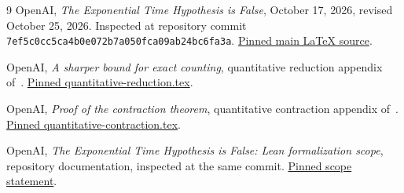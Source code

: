\documentclass[11pt]{article}
\theoremstyle{definition}
\theoremstyle{remark}
\newcommand{\upstream}{7ef5c0cc5ca4b0e072b7a050fca09ab24bc6fa3a}
\begin{document}
\begin{thebibliography}{9}
OpenAI, \emph{The Exponential Time Hypothesis is False}, October 17, 2026,
revised October 25, 2026. Inspected at repository commit
\texttt{\upstream}.
\href{https://github.com/openai/math/blob/7ef5c0cc5ca4b0e072b7a050fca09ab24bc6fa3a/preprints/The-Exponential-Time-Hypothesis-is-False-October-25-2026/build/main_full_version.tex}{Pinned main LaTeX source}.

OpenAI, \emph{A sharper bound for exact counting}, quantitative reduction
appendix of~\cite{source}.
\href{https://github.com/openai/math/blob/7ef5c0cc5ca4b0e072b7a050fca09ab24bc6fa3a/preprints/The-Exponential-Time-Hypothesis-is-False-October-25-2026/build/quantitative-reduction.tex}{Pinned quantitative-reduction.tex}.

OpenAI, \emph{Proof of the contraction theorem}, quantitative contraction
appendix of~\cite{source}.
\href{https://github.com/openai/math/blob/7ef5c0cc5ca4b0e072b7a050fca09ab24bc6fa3a/preprints/The-Exponential-Time-Hypothesis-is-False-October-25-2026/build/quantitative-contraction.tex}{Pinned quantitative-contraction.tex}.

OpenAI, \emph{The Exponential Time Hypothesis is False: Lean formalization
scope}, repository documentation, inspected at the same commit.
\href{https://github.com/openai/math/blob/7ef5c0cc5ca4b0e072b7a050fca09ab24bc6fa3a/lean/docs/378.md}{Pinned scope statement}.
\end{thebibliography}
\end{document}
